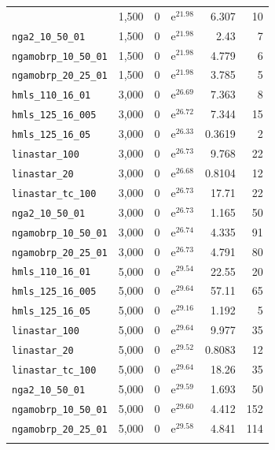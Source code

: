 \begin{longtable}{|l|r|r|r|r|r|}
{    \texttt{namoa\_tc} & 1,500 & 0 & $\mathrm{e}^{21.98}$ & 6.307 & 10 \\
    \texttt{nga2\_10\_50\_01} & 1,500 & 0 & $\mathrm{e}^{21.98}$ & 2.43 & 7 \\
    \texttt{ngamobrp\_10\_50\_01} & 1,500 & 0 & $\mathrm{e}^{21.98}$ & 4.779 & 6 \\
    \texttt{ngamobrp\_20\_25\_01} & 1,500 & 0 & $\mathrm{e}^{21.98}$ & 3.785 & 5 \\
    \texttt{hmls\_110\_16\_01} & 3,000 & 0 & $\mathrm{e}^{26.69}$ & 7.363 & 8 \\
    \texttt{hmls\_125\_16\_005} & 3,000 & 0 & $\mathrm{e}^{26.72}$ & 7.344 & 15 \\
    \texttt{hmls\_125\_16\_05} & 3,000 & 0 & $\mathrm{e}^{26.33}$ & 0.3619 & 2 \\
    \texttt{linastar\_100} & 3,000 & 0 & $\mathrm{e}^{26.73}$ & 9.768 & 22 \\
    \texttt{linastar\_20} & 3,000 & 0 & $\mathrm{e}^{26.68}$ & 0.8104 & 12 \\
    \texttt{linastar\_tc\_100} & 3,000 & 0 & $\mathrm{e}^{26.73}$ & 17.71 & 22 \\
    \texttt{nga2\_10\_50\_01} & 3,000 & 0 & $\mathrm{e}^{26.73}$ & 1.165 & 50 \\
    \texttt{ngamobrp\_10\_50\_01} & 3,000 & 0 & $\mathrm{e}^{26.74}$ & 4.335 & 91 \\
    \texttt{ngamobrp\_20\_25\_01} & 3,000 & 0 & $\mathrm{e}^{26.73}$ & 4.791 & 80 \\
    \texttt{hmls\_110\_16\_01} & 5,000 & 0 & $\mathrm{e}^{29.54}$ & 22.55 & 20 \\
    \texttt{hmls\_125\_16\_005} & 5,000 & 0 & $\mathrm{e}^{29.64}$ & 57.11 & 65 \\
    \texttt{hmls\_125\_16\_05} & 5,000 & 0 & $\mathrm{e}^{29.16}$ & 1.192 & 5 \\
    \texttt{linastar\_100} & 5,000 & 0 & $\mathrm{e}^{29.64}$ & 9.977 & 35 \\
    \texttt{linastar\_20} & 5,000 & 0 & $\mathrm{e}^{29.52}$ & 0.8083 & 12 \\
    \texttt{linastar\_tc\_100} & 5,000 & 0 & $\mathrm{e}^{29.64}$ & 18.26 & 35 \\
    \texttt{nga2\_10\_50\_01} & 5,000 & 0 & $\mathrm{e}^{29.59}$ & 1.693 & 50 \\
    \texttt{ngamobrp\_10\_50\_01} & 5,000 & 0 & $\mathrm{e}^{29.60}$ & 4.412 & 152 \\
    \texttt{ngamobrp\_20\_25\_01} & 5,000 & 0 & $\mathrm{e}^{29.58}$ & 4.841 & 114 \\
}
\end{longtable}
